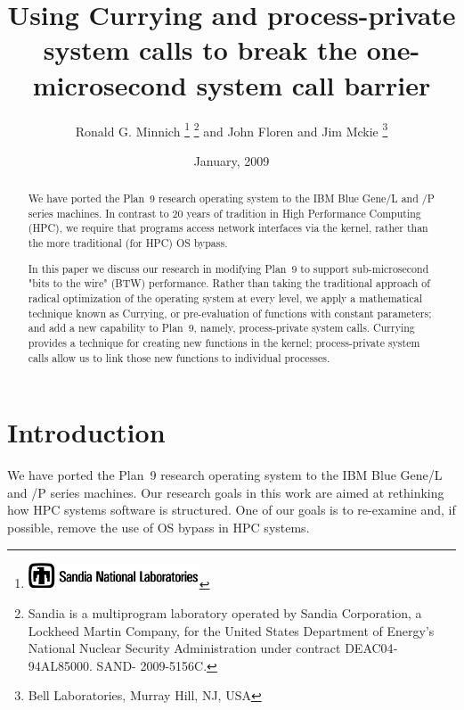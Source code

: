 \documentclass[letterpaper]{article}
\date{January, 2009}
\begin{document}
\author{Ronald G. Minnich%
\thanks{\protect\includegraphics[height=0.3in]{thunderchicken}%
}%
\thanks{Sandia is a multiprogram laboratory operated by Sandia Corporation, a Lockheed Martin Company, for the United States Department of Energy’s National Nuclear Security Administration under contract DE­AC04­94AL85000. SAND- 2009-5156C.}  and John Floren and Jim Mckie
\thanks{Bell Laboratories, Murray Hill, NJ, USA }
}
\title{Using Currying and process-private system calls to break the one-microsecond system call barrier}
\maketitle
\thispagestyle{empty}
\pagestyle{empty}
\begin{abstract}
We have ported the Plan~9 research operating system to the IBM Blue Gene/L and /P series machines. In contrast 
to 20 years of tradition in High Performance Computing (HPC), we require that programs access network interfaces via
the kernel, rather than the more traditional (for HPC) OS bypass.

In this paper we discuss our research in modifying Plan~9 to support sub-microsecond "bits to the wire" (BTW) 
performance. Rather than taking the traditional approach of radical optimization of the operating system at 
every level, we apply a mathematical technique known as Currying, or pre-evaluation of functions with constant 
parameters; and add a new capability to Plan~9, namely, process-private system calls. Currying provides 
a technique for creating new functions in the kernel; process-private system calls allow us to link 
those new functions to individual processes. 
\end{abstract}

\section{Introduction}
We have ported the Plan~9 research operating system to the IBM Blue Gene/L and /P series machines. 
Our research goals in this work are aimed at rethinking how HPC systems software is structured. 
One of our goals is to  re-examine and, if possible, 
remove the use of OS bypass in HPC systems. 
\end{document}

